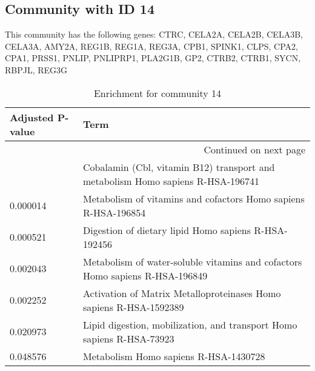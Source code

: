 \subsection*{Community with ID 14}
This community has the following genes: CTRC, CELA2A, CELA2B, CELA3B, CELA3A, AMY2A, REG1B, REG1A, REG3A, CPB1, SPINK1, CLPS, CPA2, CPA1, PRSS1, PNLIP, PNLIPRP1, PLA2G1B, GP2, CTRB2, CTRB1, SYCN, RBPJL, REG3G
\\
\begin{longtable}{p{2.4cm}p{14.5cm}}
\caption{Enrichment for community 14}\\
\toprule
Adjusted \newline P-value &                                                                             Term \\
\midrule
\endhead
\midrule
\multicolumn{2}{r}{{Continued on next page}} \\
\midrule
\endfoot

\bottomrule
\endlastfoot
                 0.000014 &  Cobalamin (Cbl, vitamin B12) transport and metabolism Homo sapiens R-HSA-196741 \\
                 0.000014 &                   Metabolism of vitamins and cofactors Homo sapiens R-HSA-196854 \\
                 0.000521 &                             Digestion of dietary lipid Homo sapiens R-HSA-192456 \\
                 0.002043 &     Metabolism of water-soluble vitamins and cofactors Homo sapiens R-HSA-196849 \\
                 0.002252 &               Activation of Matrix Metalloproteinases Homo sapiens R-HSA-1592389 \\
                 0.020973 &            Lipid digestion, mobilization, and transport Homo sapiens R-HSA-73923 \\
                 0.048576 &                                            Metabolism Homo sapiens R-HSA-1430728 \\
\end{longtable}


